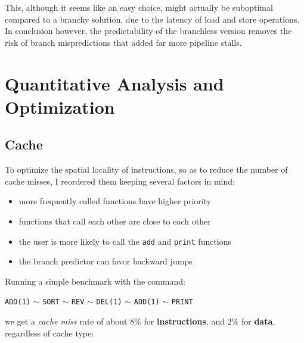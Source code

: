 \documentclass[a4paper,12pt]{article}
\begin{document}
This, although it seems like an easy choice, might actually be suboptimal compared to a branchy solution, due to the latency of load and store operations. In conclusion however, the predictability of the branchless version removes the risk of branch mispredictions that added far more pipeline stalls.

\section{Quantitative Analysis and Optimization}

\subsection{Cache}

To optimize the spatial locality of instructions, so as to reduce the number of cache misses, I reordered them keeping several factors in mind:

\begin{itemize}
    \item more frequently called functions have higher priority
    \item functions that call each other are close to each other
    \item the user is more likely to call the \texttt{add} and \texttt{print} functions
    \item the branch predictor can favor backward jumps
\end{itemize}

Running a simple benchmark with the command:

\begin{center}
\texttt{ADD(1)} $\sim$ \texttt{SORT} $\sim$ \texttt{REV} $\sim$ \texttt{DEL(1)} $\sim$ \texttt{ADD(1)} $\sim$ \texttt{PRINT}
\end{center}

we get a \emph{cache miss} rate of about 8\% for \textbf{instructions}, and 2\% for \textbf{data}, regardless of cache type:
\end{document}
